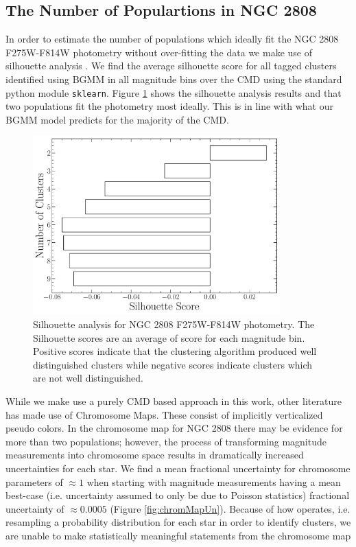 \subsection{The Number of Populartions in NGC 2808}
In order to estimate the number of populations which ideally fit the NGC 2808
F275W-F814W photometry without over-fitting the data we make use of silhouette
analysis \citep[][and in a similar manner to how \citet{Valle2022} perform
their analysis of spectroscopic data]{ROUSSEEUW198753}. We find the average
silhouette score for all tagged clusters identified using BGMM in all magnitude
bins over the CMD using the standard python module \texttt{sklearn}. Figure
\ref{fig:clusterAn} shows the silhouette analysis results and that two
populations fit the photometry most ideally. This is in line with what our BGMM
model predicts for the majority of the CMD.

\begin{figure}
  \centering
  \includegraphics[width=0.85\textwidth]{figures/ngc2808/ClusterAnalysis.pdf}
  \caption{Silhouette analysis for NGC 2808 F275W-F814W photometry. The
  Silhouette scores are an average of score for each magnitude bin. Positive
  scores indicate that the clustering algorithm produced well distinguished
  clusters while negative scores indicate clusters which are not well
  distinguished.}
  \label{fig:clusterAn}
\end{figure}

While we make use a purely CMD based approach in this work, other literature
has made use of Chromosome Maps. These consist of implicitly verticalized
pseudo colors. In the chromosome map for NGC 2808 there may be evidence for
more than two populations; however, the process of transforming magnitude
measurements into chromosome space results in dramatically increased
uncertainties for each star. We find a mean fractional uncertainty for
chromosome parameters of $\approx1$ when starting with magnitude measurements
having a mean best-case (i.e. uncertainty assumed to only be due to Poisson
statistics) fractional uncertainty of $\approx 0.0005$ (Figure
\ref{fig:chromMapUn}). Because of how \fidanka operates, i.e. resampling a
probability distribution for each star in order to identify clusters, we are
unable to make statistically meaningful statements from the chromosome map


